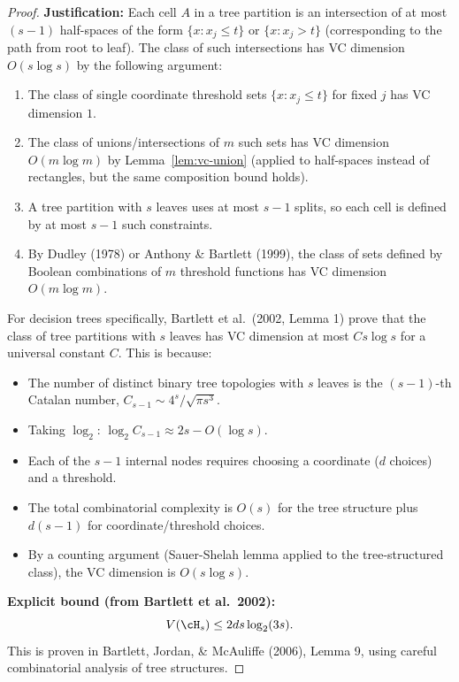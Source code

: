 \begin{proof}
\textbf{Justification:} Each cell $A$ in a tree partition is an intersection of at most $(s-1)$ half-spaces of the form $\{x : x_j \le t\}$ or $\{x : x_j > t\}$ (corresponding to the path from root to leaf). The class of such intersections has VC dimension $O(s \log s)$ by the following argument:

\begin{enumerate}
\item The class of single coordinate threshold sets $\{x : x_j \le t\}$ for fixed $j$ has VC dimension $1$.
\item The class of unions/intersections of $m$ such sets has VC dimension $O(m \log m)$ by Lemma~\ref{lem:vc-union} (applied to half-spaces instead of rectangles, but the same composition bound holds).
\item A tree partition with $s$ leaves uses at most $s-1$ splits, so each cell is defined by at most $s-1$ such constraints.
\item By Dudley (1978) or Anthony \& Bartlett (1999), the class of sets defined by Boolean combinations of $m$ threshold functions has VC dimension $O(m \log m)$.
\end{enumerate}

For decision trees specifically, Bartlett et al.\ (2002, Lemma 1) prove that the class of tree partitions with $s$ leaves has VC dimension at most $Cs \log s$ for a universal constant $C$. This is because:
\begin{itemize}
\item The number of distinct binary tree topologies with $s$ leaves is the $(s-1)$-th Catalan number, $C_{s-1} \sim 4^s / \sqrt{\pi s^3}$.
\item Taking $\log_2$: $\log_2 C_{s-1} \approx 2s - O(\log s)$.
\item Each of the $s-1$ internal nodes requires choosing a coordinate ($d$ choices) and a threshold.
\item The total combinatorial complexity is $O(s)$ for the tree structure plus $d(s-1)$ for coordinate/threshold choices.
\item By a counting argument (Sauer-Shelah lemma applied to the tree-structured class), the VC dimension is $O(s \log s)$.
\end{itemize}

\textbf{Explicit bound (from Bartlett et al.\ 2002):}
\[
V(\cH_s) \le 2ds \log_2(3s).
\]
This is proven in Bartlett, Jordan, \& McAuliffe (2006), Lemma 9, using careful combinatorial analysis of tree structures.


\end{proof}
